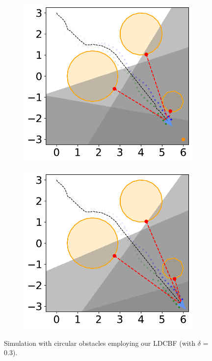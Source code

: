 \begin{figure}[H]
    \begin{subfigure}{0.35\textwidth}
        \centering
        \includegraphics[width=\textwidth]{figures/Simulations/sim1circles_delta/frame_8.pdf}
    \end{subfigure}%
    \hfil
    \begin{subfigure}{0.35\textwidth}
        \centering
        \includegraphics[width=\textwidth]{figures/Simulations/sim1circles_delta/frame_9.pdf}
    \end{subfigure}
    
    \caption[short]{Simulation with circular obstacles employing our LDCBF (with $\delta$ = 0.3).}
    \label{fig:sim1_delta_frames}
\end{figure}
\thispagestyle{empty}